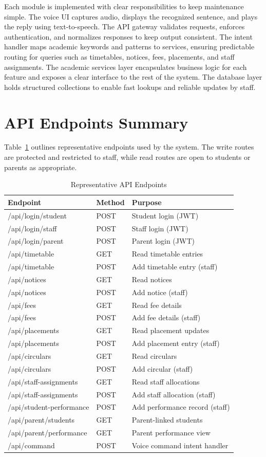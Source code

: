 ﻿\documentclass[conference]{IEEEtran}
\begin{document}
Each module is implemented with clear responsibilities to keep maintenance simple. The voice UI captures audio, displays the recognized sentence, and plays the reply using text-to-speech. The API gateway validates requests, enforces authentication, and normalizes responses to keep output consistent. The intent handler maps academic keywords and patterns to services, ensuring predictable routing for queries such as timetables, notices, fees, placements, and staff assignments. The academic services layer encapsulates business logic for each feature and exposes a clear interface to the rest of the system. The database layer holds structured collections to enable fast lookups and reliable updates by staff.

\section{API Endpoints Summary}
Table~\ref{tab:apis} outlines representative endpoints used by the system. The write routes are protected and restricted to staff, while read routes are open to students or parents as appropriate.

\begin{table}[htbp]
\caption{Representative API Endpoints}
\label{tab:apis}
\centering
\begin{tabular}{@{}lll@{}}
\toprule
\textbf{Endpoint} & \textbf{Method} & \textbf{Purpose} \\
\midrule
/api/login/student & POST & Student login (JWT) \\
/api/login/staff & POST & Staff login (JWT) \\
/api/login/parent & POST & Parent login (JWT) \\
/api/timetable & GET & Read timetable entries \\
/api/timetable & POST & Add timetable entry (staff) \\
/api/notices & GET & Read notices \\
/api/notices & POST & Add notice (staff) \\
/api/fees & GET & Read fee details \\
/api/fees & POST & Add fee details (staff) \\
/api/placements & GET & Read placement updates \\
/api/placements & POST & Add placement entry (staff) \\
/api/circulars & GET & Read circulars \\
/api/circulars & POST & Add circular (staff) \\
/api/staff-assignments & GET & Read staff allocations \\
/api/staff-assignments & POST & Add staff allocation (staff) \\
/api/student-performance & POST & Add performance record (staff) \\
/api/parent/students & GET & Parent-linked students \\
/api/parent/performance & GET & Parent performance view \\
/api/command & POST & Voice command intent handler \\
\bottomrule
\end{tabular}
\end{table}
\end{document}
